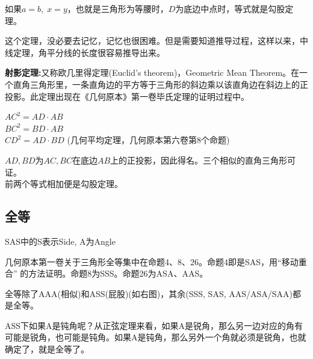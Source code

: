 \documentclass[../main.tex]{subfiles}
\begin{document}
如果$a=b, \; x=y$，也就是三角形为等腰时，$D$为底边中点时，等式就是勾股定理。

这个定理，没必要去记忆，记忆也很困难。但是需要知道推导过程，这样以来，中线定理，角平分线的长度很容易推导出来。

\textbf{射影定理:}又称欧几里得定理(Euclid's theorem)，Geometric Mean Theorem。在一个直角三角形里，一条直角边的平方等于三角形的斜边乘以该直角边在斜边上的正投影。此定理出现在《几何原本》第一卷毕氏定理的证明过程中。

\begin{minipage}{.4\textwidth}
  \centering
\end{minipage}
\begin{minipage}{.6\textwidth}
  $AC^2=AD\cdot AB$\\
  $BC^2=BD\cdot AB$\\
  $CD^2=AD\cdot BD${
    \footnotesize
    (几何平均定理，几何原本第六卷第8个命题)
  }
\end{minipage}

$AD,BD$为$AC,BC$在底边$AB$上的正投影，因此得名。三个相似的直角三角形可证。\\前两个等式相加便是勾股定理。

\subsection{全等}
SAS中的S表示Side, A为Angle

几何原本第一卷关于三角形全等集中在命题4、8、26。命题4即是SAS，用“移动重合” 的方法证明。命题8为SSS。命题26为ASA、AAS。

\begin{minipage}{0.8\textwidth}
  全等除了AAA(相似)和ASS(屁股)(如右图)，其余(SSS, SAS, AAS/ASA/SAA)都是全等。

  ASS下如果A是钝角呢？从正弦定理来看，如果A是锐角，那么另一边对应的角有可能是锐角，也可能是钝角。如果A是钝角，那么另外一个角就必须是锐角，也就确定了，就是全等了。
\end{minipage}
\begin{minipage}{0.2\textwidth}
  \centering
\end{minipage}
\end{document}
